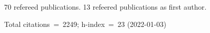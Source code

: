 70 refereed publications. 13 refeered publications as first author.

Total citations~=~2249; h-index~=~23 (2022-01-03)